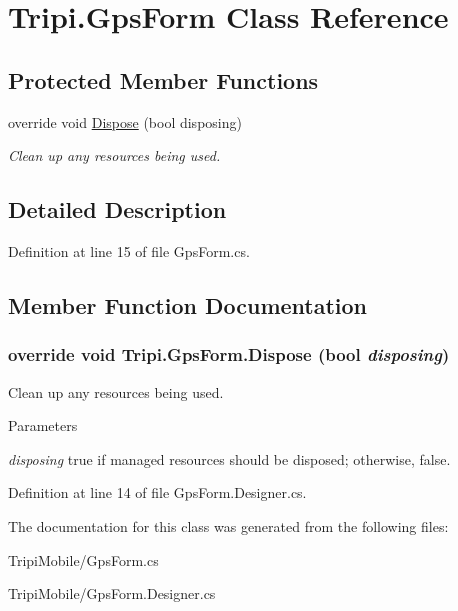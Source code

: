 \hypertarget{class_tripi_1_1_gps_form}{
\section{Tripi.GpsForm Class Reference}
\label{class_tripi_1_1_gps_form}
}
\subsection*{Protected Member Functions}
\begin{DoxyCompactItemize}
\item 
override void \hyperlink{class_tripi_1_1_gps_form_ab36ff51300fdbed86f459fc4381432a3}{Dispose} (bool disposing)
\begin{DoxyCompactList}\small\item\em Clean up any resources being used. \item\end{DoxyCompactList}\end{DoxyCompactItemize}


\subsection{Detailed Description}


Definition at line 15 of file GpsForm.cs.

\subsection{Member Function Documentation}
\hypertarget{class_tripi_1_1_gps_form_ab36ff51300fdbed86f459fc4381432a3}{
\subsubsection[{Dispose}]{\setlength{\rightskip}{0pt plus 5cm}override void Tripi.GpsForm.Dispose (bool {\em disposing})}}
\label{class_tripi_1_1_gps_form_ab36ff51300fdbed86f459fc4381432a3}


Clean up any resources being used. 
\begin{DoxyParams}{Parameters}
\item[{\em disposing}]true if managed resources should be disposed; otherwise, false.\end{DoxyParams}


Definition at line 14 of file GpsForm.Designer.cs.

The documentation for this class was generated from the following files:\begin{DoxyCompactItemize}
\item 
TripiMobile/GpsForm.cs\item 
TripiMobile/GpsForm.Designer.cs\end{DoxyCompactItemize}
